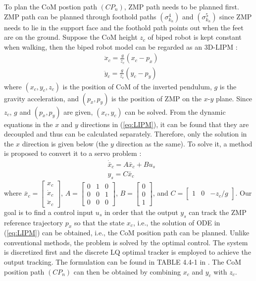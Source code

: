 \documentclass[journal,12pt,onecolumn,draftclsnofoot,]{IEEEtran}
\begin{document}
To plan the CoM postion path $(CP_n)$, ZMP path needs to be planned first. ZMP path can be planned through foothold paths $(\sigma^{4}_{k_n})$ and $(\sigma^{5}_{k_n})$ since ZMP needs to lie in the support face and the foothold path points out when the feet are on the ground. Suppose the CoM height $z_c$ of biped robot is kept constant when walking, then the biped robot model can be regarded as an 3D-LIPM \cite{kajita2001real}:
\begin{equation} \label{eq:LIPM}
    \begin{split}
        & \ddot{x}_c = \frac{g}{z_c}(x_c - p_x) \\
        & \ddot{y}_c = \frac{g}{z_c}(y_c - p_y)
    \end{split}
\end{equation}
where $(x_c, y_c, z_c)$ is the position of CoM of the inverted pendulum, $g$ is the gravity acceleration, and $(p_x,p_y)$ is the position of ZMP on the $x$-$y$ plane. Since $z_c$, $g$ and $(p_x,p_y)$ are given, $(x_c, y_c)$ can be solved. From the dynamic equations in the $x$ and $y$ directions in (\ref{eq:LIPM}), it can be found that they are decoupled and thus can be calculated separately. Therefore, only the solution in the $x$ direction is given below (the $y$ direction as the same). To solve it, a method is proposed to convert it to a servo problem \cite{1241826}:
\begin{equation} \label{eq:output tracking}
    \begin{split}
        & \dot{\bar{x}}_c = A\bar{x}_c + Bu_s \\
        & y_s = C\bar{x}_c
    \end{split}
\end{equation}
where $\bar{x}_c = \begin{bmatrix}
    x_c \\ \dot{x}_c \\ \ddot{x}_c
\end{bmatrix}$, $A = \begin{bmatrix}
    0 & 1 & 0 \\ 0 & 0 & 1 \\ 0 & 0 & 0
\end{bmatrix}$, $B = \begin{bmatrix}
    0 \\ 0 \\ 1
\end{bmatrix}$, and $C = \begin{bmatrix}
    1 & 0 & -z_c/g
\end{bmatrix}$. Our goal is to find a control input $u_s$ in order that the output $y_s$ can track the ZMP reference trajectory $p_x$ so that the state $x_c$, i.e., the solution of ODE in (\ref{eq:LIPM}) can be obtained, i.e., the CoM position path can be planned. Unlike conventional methods, the problem is solved by the optimal control. The system is discretized first and the discrete LQ optimal tracker is employed to achieve the output tracking. The formulation can be found in TABLE 4.4-1 in \cite{lewis2012optimal}. The CoM position path $(CP_n)$ can then be obtained by combining $x_c$ and $y_c$ with $z_c$.
\end{document}
